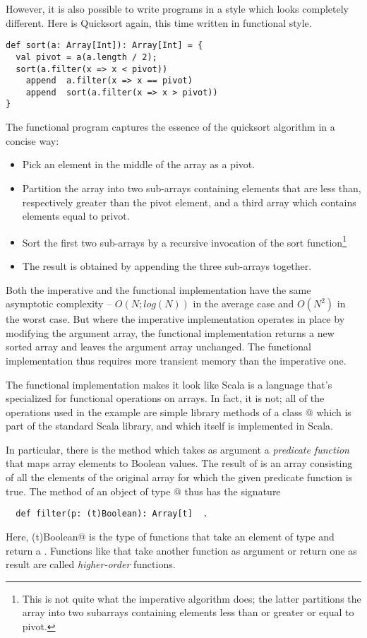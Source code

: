 \documentclass[11pt]{report}
\begin{document}
However, it is also possible to write programs in a style which looks
completely different. Here is Quicksort again, this time written in
functional style.

\begin{verbatim}
def sort(a: Array[Int]): Array[Int] = {
  val pivot = a(a.length / 2);
  sort(a.filter(x => x < pivot))
    append  a.filter(x => x == pivot)
    append  sort(a.filter(x => x > pivot))
}
\end{verbatim}

The functional program captures the essence of the quicksort algorithm
in a concise way:
\begin{itemize}
\item Pick an element in the middle of the array as a pivot.
\item Partition the array into two sub-arrays containing elements that
are less than, respectively greater than the pivot element, and a
third array which contains elements equal to privot.
\item Sort the first two sub-arrays by a recursive invocation of
the sort function\footnote{This is not quite what the imperative algorithm does;
the latter partitions the array into two subarrays containing elements
less than or greater or equal to pivot.}
\item The result is obtained by appending the three sub-arrays together.
\end{itemize}
Both the imperative and the functional implementation have the same
asymptotic complexity -- $O(N;log(N))$ in the average case and
$O(N^2)$ in the worst case. But where the imperative implementation
operates in place by modifying the argument array, the functional
implementation returns a new sorted array and leaves the argument
array unchanged. The functional implementation thus requires more
transient memory than the imperative one.

The functional implementation makes it look like Scala is a language
that's specialized for functional operations on arrays. In fact, it
is not; all of the operations used in the example are simple library
methods of a class \verb@Array[t]@ which is part of the standard
Scala library, and which itself is implemented in Scala.

In particular, there is the method \verb@filter@ which takes as
argument a {\em predicate function} that maps array elements to
Boolean values. The result of \verb@filter@ is an array consisting of
all the elements of the original array for which the given predicate
function is true.  The \verb@filter@ method of an object of type
\verb@Array[t]@ thus has the signature
\begin{verbatim}
  def filter(p: (t)Boolean): Array[t]  .
\end{verbatim}
Here, \verb@(t)Boolean@ is the type of functions that take an element
of type \verb@t@ and return a \verb@Boolean@.  Functions like
\verb@filter@ that take another function as argument or return one as
result are called {\em higher-order} functions.
\end{document}
